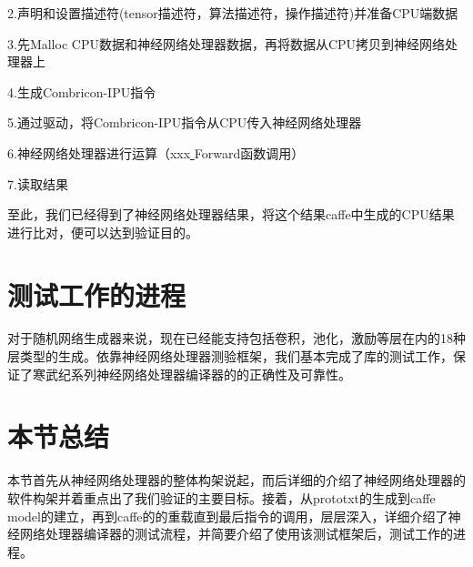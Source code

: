 2.声明和设置描述符(tensor描述符，算法描述符，操作描述符)并准备CPU端数据

3.先Malloc CPU数据和神经网络处理器数据，再将数据从CPU拷贝到神经网络处理器上

4.生成Combricon-IPU指令

5.通过驱动，将Combricon-IPU指令从CPU传入神经网络处理器

6.神经网络处理器进行运算（xxx\underline{ }Forward函数调用）

7.读取结果

至此，我们已经得到了神经网络处理器结果，将这个结果caffe中生成的CPU结果进行比对，便可以达到验证目的。
\section{测试工作的进程}
对于随机网络生成器来说，现在已经能支持包括卷积，池化，激励等层在内的18种层类型的生成。依靠神经网络处理器测验框架，我们基本完成了库的测试工作，保证了寒武纪系列神经网络处理器编译器的的正确性及可靠性。
\section{本节总结}
本节首先从神经网络处理器的整体构架说起，而后详细的介绍了神经网络处理器的软件构架并着重点出了我们验证的主要目标。接着，从prototxt的生成到caffe\underline{ }model的建立，再到caffe的的重载直到最后指令的调用，层层深入，详细介绍了神经网络处理器编译器的测试流程，并简要介绍了使用该测试框架后，测试工作的进程。